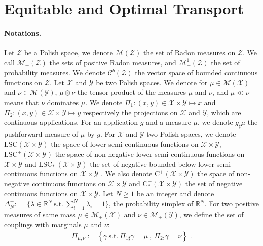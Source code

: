\section{Equitable and Optimal Transport}
\label{sec:MOT}
\paragraph{Notations.} Let $\mathcal{Z}$ be a Polish space, we denote $\mathcal{M}(\mathcal{Z})$ the set of Radon measures on $\mathcal{Z}$. We call $\mathcal{M}_+(\mathcal{Z})$ the sets of positive Radon measures, and  $\mathcal{M}_+^1(\mathcal{Z})$ the set of probability measures. We denote $\mathcal{C}^b(\mathcal{Z})$ the vector space of bounded continuous functions on $\mathcal{Z}$. Let $\mathcal{X}$ and $\mathcal{Y}$ be two Polish spaces.  We denote for $\mu\in\mathcal{M}(\mathcal{X})$ and $\nu\in\mathcal{M}(\mathcal{Y})$, $\mu\otimes\nu$ the tensor product of the measures $\mu$ and $\nu$, and $\mu\ll\nu$ means that $\nu$ dominates $\mu$. We denote $\Pi_1:(x,y)\in\mathcal{X}\times\mathcal{Y}\mapsto x$ and $\Pi_2:(x,y)\in\mathcal{X}\times\mathcal{Y}\mapsto y$ respectively the projections on $\mathcal{X}$ and  $\mathcal{Y}$, which are continuous applications. For an application $g$ and a measure $\mu$, we denote $g_\sharp\mu$ the pushforward measure of $\mu$ by $g$.  For  $\mathcal{X}$ and $\mathcal{Y}$ two Polish spaces, we denote $\mathrm{LSC}(\mathcal{X}\times\mathcal{Y})$ the space of lower semi-continuous functions on $\mathcal{X}\times\mathcal{Y}$,  $\mathrm{LSC}^+(\mathcal{X}\times\mathcal{Y})$ the space of non-negative lower semi-continuous functions on $\mathcal{X}\times\mathcal{Y}$ and $\mathrm{LSC}^-_{*}(\mathcal{X}\times\mathcal{Y})$ the set of negative bounded below lower semi-continuous functions on $\mathcal{X}\times\mathcal{Y}$ . We also denote $\mathrm{C}^+(\mathcal{X}\times\mathcal{Y})$ the space of non-negative continuous functions on $\mathcal{X}\times\mathcal{Y}$ and $\mathrm{C}^-_{*}(\mathcal{X}\times\mathcal{Y})$ the set of negative continuous functions on $\mathcal{X}\times\mathcal{Y}$. Let $N\geq 1$ be an integer and denote $\Delta_N^{+}: = \{\lambda\in\mathbb{R}_+^N~\mathrm{s.t.}~\sum_{i=1}^N\lambda_i=1\}$, the probability simplex of $\mathbb{R}^N$.
For two positive measures of same mass $\mu\in\mathcal{M}_+(\mathcal{X})$ and $\nu\in\mathcal{M}_+(\mathcal{Y})$, we define the set of couplings with marginals $\mu$ and $\nu$:
\begin{align*}
    \Pi_{\mu,\nu}:=\left\{\gamma~\mathrm{s.t.}~ \Pi_{1\sharp}\gamma=\mu ~,~ \Pi_{2\sharp}\gamma=\nu\right\}\; .
\end{align*}
